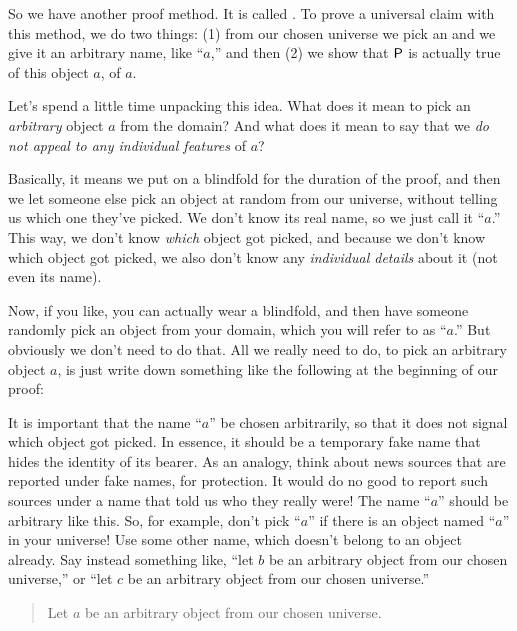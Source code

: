 \documentclass[../../../main.tex]{subfiles}
\begin{document}
So we have another proof method. It is called . To prove a universal claim with this method, we do two things: (1) from our chosen universe we pick an  and we give it an arbitrary name, like ``$a$,'' and then (2) we show that $\P/$ is actually true of this object $a$,  of $a$.

Let's spend a little time unpacking this idea. What does it mean to pick an \emph{arbitrary} object $a$ from the domain? And what does it mean to say that we \emph{do not appeal to any individual features} of $a$? 

Basically, it means we put on a blindfold for the duration of the proof, and then we let someone else pick an object at random from our universe, without telling us which one they've picked. We don't know its real name, so we just call it ``$a$.'' This way, we don't know \emph{which} object got picked, and because we don't know which object got picked, we also don't know any \emph{individual details} about it (not even its name).

Now, if you like, you can actually wear a blindfold, and then have someone randomly pick an object from your domain, which you will refer to as ``$a$.'' But obviously we don't need to do that. All we really need to do, to pick an arbitrary object $a$, is just write down something like the following at the beginning of our proof:

\begin{aside}
  \begin{remark}
    It is important that the name ``$a$'' be chosen arbitrarily, so that it does not signal which object got picked. In essence, it should be a temporary fake name that hides the identity of its bearer. As an analogy, think about news sources that are reported under fake names, for protection. It would do no good to report such sources under a name that told us who they really were! The name ``$a$'' should be arbitrary like this. So, for example, don't pick ``$a$'' if there is an object named ``$a$'' in your universe! Use some other name, which doesn't belong to an object already. Say instead something like, ``let $b$ be an arbitrary object from our chosen universe,'' or ``let $c$ be an arbitrary object from our chosen universe.''
  \end{remark}
\end{aside}

\begin{quote}
  Let $a$ be an arbitrary object from our chosen universe.
\end{quote}
\end{document}
